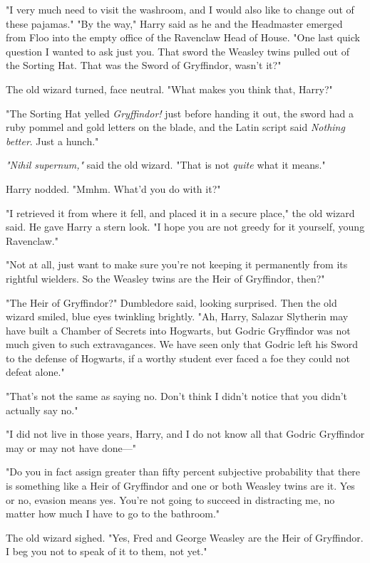 "I very much need to visit the washroom, and I would also like to change out of
these pajamas."
\sbreak
"By the way," Harry said as he and the Headmaster emerged from Floo into the
empty office of the Ravenclaw Head of House. "One last quick question I wanted
to ask just you. That sword the Weasley twins pulled out of the Sorting Hat.
That was the Sword of Gryffindor, wasn't it?"

The old wizard turned, face neutral. "What makes you think that, Harry?"

"The Sorting Hat yelled \emph{Gryffindor!} just before handing it out, the
sword had a ruby pommel and gold letters on the blade, and the Latin script
said \emph{Nothing better}. Just a hunch."

\emph{"Nihil supernum,"} said the old wizard. "That is not \emph{quite} what it
means."

Harry nodded. "Mmhm. What'd you do with it?"

"I retrieved it from where it fell, and placed it in a secure place," the old
wizard said. He gave Harry a stern look. "I hope you are not greedy for it
yourself, young Ravenclaw."

"Not at all, just want to make sure you're not keeping it permanently from its
rightful wielders. So the Weasley twins are the Heir of Gryffindor, then?"

"The Heir of Gryffindor?" Dumbledore said, looking surprised. Then the old
wizard smiled, blue eyes twinkling brightly. "Ah, Harry, Salazar Slytherin may
have built a Chamber of Secrets into Hogwarts, but Godric Gryffindor was not
much given to such extravagances. We have seen only that Godric left his Sword
to the defense of Hogwarts, if a worthy student ever faced a foe they could not
defeat alone."

"That's not the same as saying no. Don't think I didn't notice that you didn't
actually say no."

"I did not live in those years, Harry, and I do not know all that Godric
Gryffindor may or may not have done\mbox{---}"

"Do you in fact assign greater than fifty percent subjective probability that
there is something like a Heir of Gryffindor and one or both Weasley twins are
it. Yes or no, evasion means yes. You're not going to succeed in distracting
me, no matter how much I have to go to the bathroom."

The old wizard sighed. "Yes, Fred and George Weasley are the Heir of
Gryffindor. I beg you not to speak of it to them, not yet."

